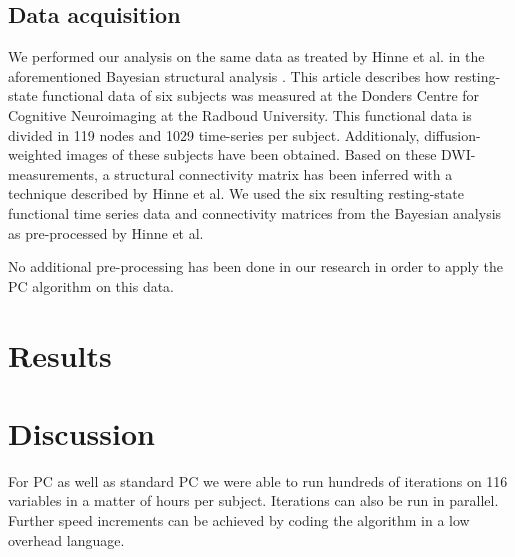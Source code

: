 \documentclass[a4paper, 10pt, english, onecolumn]{article}
\begin{document}
\subsection{Data acquisition}\label{sec:data}
We performed our analysis on the same data as treated by Hinne et al. in the aforementioned Bayesian structural analysis \cite{hinne2013, hinne2013structfunc}.
This article describes how resting-state functional data of six subjects was measured at the Donders Centre for Cognitive Neuroimaging at the Radboud University.
This functional data is divided in 119 nodes and 1029 time-series per subject.
Additionaly, diffusion-weighted images of these subjects have been obtained.
Based on these DWI-measurements, a structural connectivity matrix has been inferred with a technique described by Hinne et al.
We used the six resulting resting-state functional time series data and connectivity matrices from the Bayesian analysis as pre-processed by Hinne et al.

No additional pre-processing has been done in our research in order to apply the PC algorithm on this data.


\section{Results}\label{sec:results}

\section{Discussion}



For PC as well as standard PC we were able to run hundreds of iterations on 116 variables in a matter of hours per subject.
Iterations can also be run in parallel.
Further speed increments can be achieved by coding the algorithm in a low overhead language.
\end{document}
